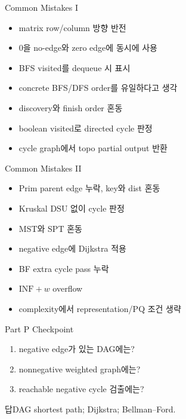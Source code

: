 \begin{frame}{Common Mistakes I}
\small\begin{itemize}\item matrix row/column 방향 반전\item 0을 no-edge와 zero edge에 동시에 사용\item BFS visited를 dequeue 시 표시\item concrete BFS/DFS order를 유일하다고 생각\item discovery와 finish order 혼동\item boolean visited로 directed cycle 판정\item cycle graph에서 topo partial output 반환\end{itemize}
\end{frame}
\begin{frame}{Common Mistakes II}
\small\begin{itemize}\item Prim parent edge 누락, key와 dist 혼동\item Kruskal DSU 없이 cycle 판정\item MST와 SPT 혼동\item negative edge에 Dijkstra 적용\item BF extra cycle pass 누락\item \(\mathrm{INF}+w\) overflow\item complexity에서 representation/PQ 조건 생략\end{itemize}
\end{frame}
\begin{frame}{Part P Checkpoint}
\begin{enumerate}\item negative edge가 있는 DAG에는?\item nonnegative weighted graph에는?\item reachable negative cycle 검출에는?\end{enumerate}
\begin{exampleblock}{답}DAG shortest path; Dijkstra; Bellman--Ford.\end{exampleblock}
\end{frame}
